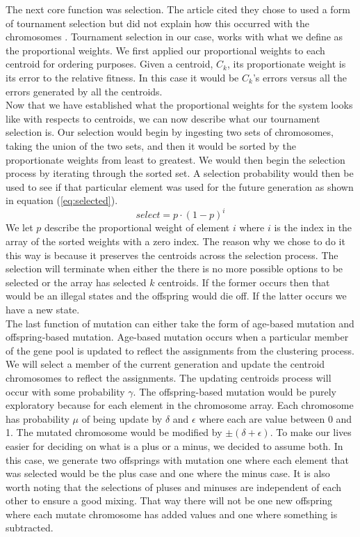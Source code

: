 \documentclass[a4paper,12pt]{article}
\numberwithin{equation}{section}
\begin{document}
The next core function was selection. The article cited they chose to used a form of tournament selection but did not explain how this occurred with the chromosomes \cite{bandyopadhyay_maulik_2002}. Tournament selection in our case, works with what we define as the proportional weights. We first applied our proportional weights to each centroid for ordering purposes. Given a centroid, $C_k$, its proportionate weight is its error to the relative fitness. In this case it would be $C_k$'s errors versus all the errors generated by all the centroids.\\ 

Now that we have established what the proportional weights for the system looks like with respects to centroids, we can now describe what our tournament selection is. Our selection would begin by ingesting two sets of chromosomes, taking the union of the two sets, and then it would be sorted by the proportionate weights from least to greatest. We would then begin the selection process by iterating through the sorted set. A selection probability would then be used to see if that particular element was used for the future generation as shown in equation (\ref{eq:selected}). 
\begin{equation}
select = p\cdot (1-p)^i
\label{eq:selected}    
\end{equation}
We let $p$ describe the proportional weight of element $i$ where $i$ is the index in the array of the sorted weights with a zero index. The reason why we chose to do it this way is because it preserves the centroids across the selection process. The selection will terminate when either the there is no more possible options to be selected or the array has selected $k$ centroids. If the former occurs then that would be an illegal states and the offspring would die off. If the latter occurs we have a new state. \\

The last function of mutation can either take the form of age-based mutation and offspring-based mutation. Age-based mutation occurs when a particular member of the gene pool is updated to reflect the assignments from the clustering process. We will select a member of the current generation and update the centroid chromosomes to reflect the assignments. The updating centroids process will occur with some probability $\gamma$. The offspring-based mutation would be purely exploratory because for each element in the chromosome array. Each chromosome has probability $\mu$ of being update by $\delta$ and $\epsilon$ where each are value between 0 and 1. The mutated chromosome would be modified by $\pm (\delta + \epsilon)$. To make our lives easier for deciding on what is a plus or a minus, we decided to assume both.  In this case, we generate two offsprings with mutation one where each element that was selected would be the plus case and one where the minus case. It is also worth noting that the selections of pluses and minuses are independent of each other to ensure a good mixing. That way there will not be one new offspring where each mutate chromosome has added values and one where something is subtracted.   \\
\end{document}
